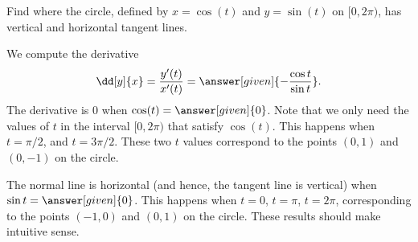 \documentclass{ximera}
\begin{document}
\begin{example}
  Find where the circle, defined by $x=\cos( t)$ and $y=\sin( t)$ on
  $[0,2\pi)$, has vertical and horizontal tangent lines.
  \begin{explanation}
    We compute the derivative 
    \[
    \dd[y]{x} = \frac{y'(t)}{x'(t)} = \answer[given]{-\frac{\cos t}{\sin t}}.
    \]
    The derivative is $0$ when $\cos( t)= \answer[given]{0}$. Note that we only need the values of $t$ in the interval $[0, 2\pi)$ that satisfy $\cos(t)$. 
    This  happens when $t=\pi/2$, and $t= 3\pi/2$. These two $t$ values correspond to the points $(0,1)$ and $(0,-1)$ on the circle.

    The normal line is horizontal (and hence, the tangent line is
    vertical) when $\sin t=\answer[given]{0}$. This happens when $t=
    0$, $t=\pi$, $t=2\pi$, corresponding to the points $(-1,0)$ and
    $(0,1)$ on the circle. These results should make intuitive sense.
  \end{explanation}





\end{example}
\end{document}
